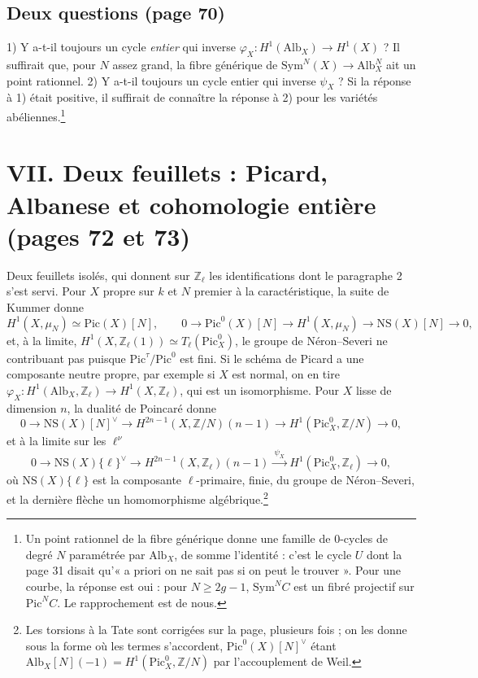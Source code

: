 \documentclass[11pt,a4paper]{article}
\begin{document}
\subsection*{Deux questions (page 70)}

1) Y a-t-il toujours un cycle \emph{entier} qui inverse $\varphi_{X} \colon
H^{1}(\mathrm{Alb}_{X}) \to H^{1}(X)$ ? Il suffirait que, pour $N$ assez grand,
la fibre générique de $\mathrm{Sym}^{N}(X) \to \mathrm{Alb}^{N}_{X}$ ait un
point rationnel. 2) Y a-t-il toujours un cycle entier qui inverse $\psi_{X}$ ?
Si la réponse à 1) était positive, il suffirait de connaître la réponse à 2)
pour les variétés abéliennes.\footnote{Un point rationnel de la fibre
générique donne une famille de $0$-cycles de degré $N$ paramétrée par
$\mathrm{Alb}_{X}$, de somme l'identité : c'est le cycle $U$ dont la
page 31 disait qu'« a priori on ne sait pas si on peut le trouver ». Pour une
courbe, la réponse est oui : pour $N \geqslant 2g - 1$, $\mathrm{Sym}^{N}C$ est
un fibré projectif sur $\mathrm{Pic}^{N}C$. Le rapprochement est de nous.}

\section*{VII. Deux feuillets : Picard, Albanese et cohomologie entière (pages 72
et 73)}

Deux feuillets isolés, qui donnent sur $\mathbb{Z}_{\ell}$ les identifications
dont le paragraphe 2 s'est servi. Pour $X$ propre sur $k$ et $N$ premier à la
caractéristique, la suite de Kummer donne
\[
H^{1}(X, \mu_{N}) \simeq \mathrm{Pic}(X)[N] , \qquad
0 \to \mathrm{Pic}^{0}(X)[N] \to H^{1}(X, \mu_{N}) \to \mathrm{NS}(X)[N] \to 0 ,
\]
et, à la limite, $H^{1}(X, \mathbb{Z}_{\ell}(1)) \simeq
T_{\ell}(\mathrm{Pic}^{0}_{X})$, le groupe de Néron--Severi ne contribuant pas
puisque $\mathrm{Pic}^{\tau}/\mathrm{Pic}^{0}$ est fini. Si le schéma de Picard a
une composante neutre propre, par exemple si $X$ est normal, on en tire
$\varphi_{X} \colon H^{1}(\mathrm{Alb}_{X}, \mathbb{Z}_{\ell}) \to H^{1}(X,
\mathbb{Z}_{\ell})$, qui est un isomorphisme. Pour $X$ lisse de dimension $n$,
la dualité de Poincaré donne
\[
0 \to \mathrm{NS}(X)[N]^{\vee} \to H^{2n-1}(X, \mathbb{Z}/N)(n-1) \to
H^{1}(\mathrm{Pic}^{0}_{X}, \mathbb{Z}/N) \to 0 ,
\]
et à la limite sur les $\ell^{\nu}$
\[
0 \to \mathrm{NS}(X)\{\ell\}^{\vee} \to H^{2n-1}(X, \mathbb{Z}_{\ell})(n-1)
\xrightarrow{\ \psi_{X}\ } H^{1}(\mathrm{Pic}^{0}_{X}, \mathbb{Z}_{\ell}) \to 0 ,
\]
où $\mathrm{NS}(X)\{\ell\}$ est la composante $\ell$-primaire, finie, du groupe de
Néron--Severi, et la dernière flèche un homomorphisme algébrique.\footnote{Les
torsions à la Tate sont corrigées sur la page, plusieurs fois ; on les donne
sous la forme où les termes s'accordent, $\mathrm{Pic}^{0}(X)[N]^{\vee}$ étant
$\mathrm{Alb}_{X}[N](-1) = H^{1}(\mathrm{Pic}^{0}_{X}, \mathbb{Z}/N)$ par
l'accouplement de Weil.}
\end{document}
